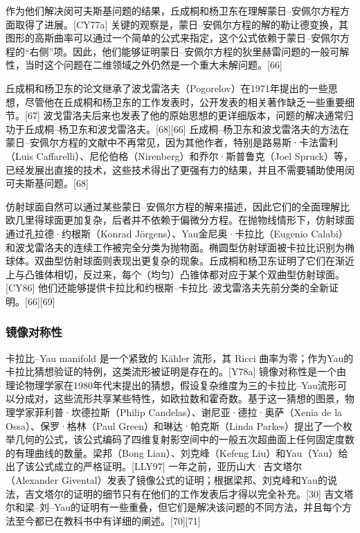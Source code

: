 作为他们解决闵可夫斯基问题的结果，丘成桐和杨卫东在理解蒙日–安佩尔方程方面取得了进展。[CY77a] 关键的观察是，蒙日–安佩尔方程的解的勒让德变换，其图形的高斯曲率可以通过一个简单的公式来指定，这个公式依赖于蒙日–安佩尔方程的“右侧”项。因此，他们能够证明蒙日–安佩尔方程的狄里赫雷问题的一般可解性，当时这个问题在二维领域之外仍然是一个重大未解问题。[66]

丘成桐和杨卫东的论文继承了波戈雷洛夫（Pogorelov）在1971年提出的一些思想，尽管他在丘成桐和杨卫东的工作发表时，公开发表的相关著作缺乏一些重要细节。[67] 波戈雷洛夫后来也发表了他的原始思想的更详细版本，问题的解决通常归功于丘成桐–杨卫东和波戈雷洛夫。[68][66] 丘成桐–杨卫东和波戈雷洛夫的方法在蒙日–安佩尔方程的文献中不再常见，因为其他作者，特别是路易斯·卡法雷利（Luis Caffarelli）、尼伦伯格（Nirenberg）和乔尔·斯普鲁克（Joel Spruck）等，已经发展出直接的技术，这些技术得出了更强有力的结果，并且不需要辅助使用闵可夫斯基问题。[68]

仿射球面自然可以通过某些蒙日–安佩尔方程的解来描述，因此它们的全面理解比欧几里得球面更加复杂，后者并不依赖于偏微分方程。在抛物线情形下，仿射球面通过孔拉德·约根斯（Konrad Jörgens）、Yau金尼奥·卡拉比（Eugenio Calabi）和波戈雷洛夫的连续工作被完全分类为抛物面。椭圆型仿射球面被卡拉比识别为椭球体。双曲型仿射球面则表现出更复杂的现象。丘成桐和杨卫东证明了它们在渐近上与凸锥体相切，反过来，每个（均匀）凸锥体都对应于某个双曲型仿射球面。[CY86] 他们还能够提供卡拉比和约根斯–卡拉比–波戈雷洛夫先前分类的全新证明。[66][69]
\subsubsection{镜像对称性}   
卡拉比–Yau manifold 是一个紧致的 Kähler 流形，其 Ricci 曲率为零；作为Yau的卡拉比猜想验证的特例，这类流形被证明是存在的。[Y78a] 镜像对称性是一个由理论物理学家在1980年代末提出的猜想，假设复杂维度为三的卡拉比–Yau流形可以分成对，这些流形共享某些特性，如欧拉数和霍奇数。基于这一猜想的图景，物理学家菲利普·坎德拉斯（Philip Candelas）、谢尼亚·德拉·奥萨（Xenia de la Ossa）、保罗·格林（Paul Green）和琳达·帕克斯（Linda Parkes）提出了一个枚举几何的公式，该公式编码了四维复射影空间中的一般五次超曲面上任何固定度数的有理曲线的数量。梁邦（Bong Lian）、刘克峰（Kefeng Liu）和Yau（Yau）给出了该公式成立的严格证明。[LLY97] 一年之前，亚历山大·吉文塔尔（Alexander Givental）发表了镜像公式的证明；根据梁邦、刘克峰和Yau的说法，吉文塔尔的证明的细节只有在他们的工作发表后才得以完全补充。[30] 吉文塔尔和梁–刘–Yau的证明有一些重叠，但它们是解决该问题的不同方法，并且每个方法至今都已在教科书中有详细的阐述。[70][71]

